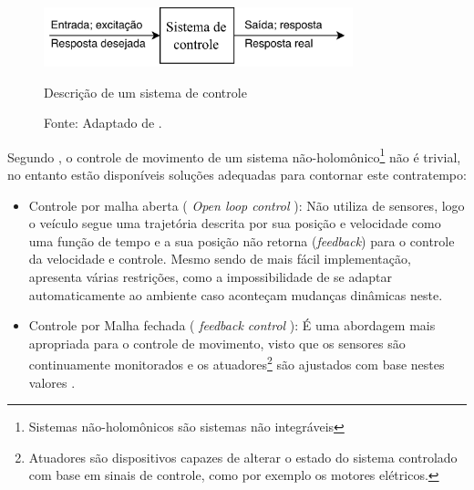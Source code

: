 \begin{figure}[h]
 \centering
 \captionsetup{width=0.8\textwidth,font=footnotesize,textfont=bf}
 \includegraphics[width=0.8\textwidth]{figuras/DiagramaNise.png}
 \caption{Descrição de um sistema de controle \label{fig:basicdiag}}
  \vspace{-0.3cm}
 \caption*{Fonte: Adaptado de \cite[p.2]{nise}.}
\end{figure}


Segundo , o controle de movimento de 
um sistema não-holomônico\footnote{Sistemas não-holomônicos são sistemas não integráveis} não é trivial, no entanto estão disponíveis 
soluções adequadas para contornar este contratempo:

\begin{itemize}
 \item Controle por malha aberta ( \textit{Open loop control} ): Não utiliza de sensores, logo o veículo segue uma trajetória descrita por 
 sua posição e velocidade como uma função de tempo e a sua posição não retorna (\textit{feedback}) para o controle da velocidade e 
 controle. Mesmo sendo de mais fácil implementação, apresenta várias restrições, como a impossibilidade de se adaptar 
 automaticamente ao ambiente caso aconteçam mudanças dinâmicas neste.
 \item Controle por Malha fechada ( \textit{feedback control} ): É uma abordagem mais apropriada para o controle de movimento, visto que 
os sensores são continuamente monitorados e os atuadores\footnote{Atuadores são dispositivos capazes de alterar 
o estado do sistema controlado com base em sinais de controle, como por exemplo os motores elétricos.} são ajustados com base nestes 
valores \cite{heinen}. 
\end{itemize}






